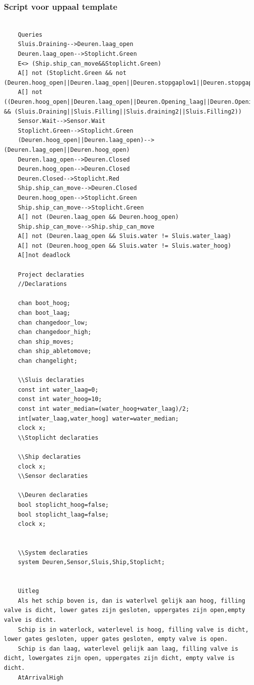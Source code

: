 \subsubsection{Script voor uppaal template}
\begin{verbatim}
	
	Queries
	Sluis.Draining-->Deuren.laag_open
	Deuren.laag_open-->Stoplicht.Green
	E<> (Ship.ship_can_move&&Stoplicht.Green)
	A[] not (Stoplicht.Green && not (Deuren.hoog_open||Deuren.laag_open||Deuren.stopgaplow1||Deuren.stopgaplow2||Deuren.stopgaphigh1||Deuren.stopgaphigh2))
	A[] not ((Deuren.hoog_open||Deuren.laag_open||Deuren.Opening_laag||Deuren.Opening_hoog||Deuren.Closing_hoog||Deuren.Closing_laag) && (Sluis.Draining||Sluis.Filling||Sluis.draining2||Sluis.Filling2))
	Sensor.Wait-->Sensor.Wait
	Stoplicht.Green-->Stoplicht.Green
	(Deuren.hoog_open||Deuren.laag_open)-->(Deuren.laag_open||Deuren.hoog_open)
	Deuren.laag_open-->Deuren.Closed
	Deuren.hoog_open-->Deuren.Closed
	Deuren.Closed-->Stoplicht.Red
	Ship.ship_can_move-->Deuren.Closed
	Deuren.hoog_open-->Stoplicht.Green
	Ship.ship_can_move-->Stoplicht.Green
	A[] not (Deuren.laag_open && Deuren.hoog_open)
	Ship.ship_can_move-->Ship.ship_can_move
	A[] not (Deuren.laag_open && Sluis.water != Sluis.water_laag)
	A[] not (Deuren.hoog_open && Sluis.water != Sluis.water_hoog)
	A[]not deadlock
	
	Project declaraties
	//Declarations
	
	chan boot_hoog;
	chan boot_laag;
	chan changedoor_low;
	chan changedoor_high;
	chan ship_moves;
	chan ship_abletomove;
	chan changelight;
	
	\\Sluis declaraties
	const int water_laag=0;
	const int water_hoog=10;
	const int water_median=(water_hoog+water_laag)/2;
	int[water_laag,water_hoog] water=water_median;
	clock x;
	\\Stoplicht declaraties
	
	\\Ship declaraties
	clock x;
	\\Sensor declaraties
	
	\\Deuren declaraties
	bool stoplicht_hoog=false;
	bool stoplicht_laag=false;
	clock x;
	
	
	\\System declaraties
	system Deuren,Sensor,Sluis,Ship,Stoplicht;
	
	
	Uitleg
	Als het schip boven is, dan is waterlvel gelijk aan hoog, filling valve is dicht, lower gates zijn gesloten, uppergates zijn open,empty valve is dicht. 
	Schip is in waterlock, waterlevel is hoog, filling valve is dicht, lower gates gesloten, upper gates gesloten, empty valve is open. 
	Schip is dan laag, waterlevel gelijk aan laag, filling valve is dicht, lowergates zijn open, uppergates zijn dicht, empty valve is dicht.
	AtArrivalHigh
	

\end{verbatim}
